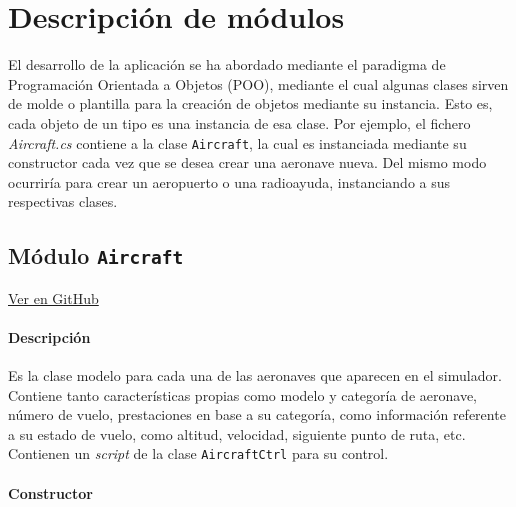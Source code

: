 \section{Descripción de módulos}
\label{sec:DescripciModulos}

El desarrollo de la aplicación se ha abordado mediante el paradigma de Programación Orientada a Objetos (POO), mediante el cual algunas clases sirven de molde o plantilla para la creación de objetos mediante su instancia. Esto es, cada objeto de un tipo es una instancia de esa clase. Por ejemplo, el fichero \textit{Aircraft.cs} contiene a la clase \texttt{Aircraft}, la cual es instanciada mediante su constructor cada vez que se desea crear una aeronave nueva. Del mismo modo ocurriría para crear un aeropuerto o una radioayuda, instanciando a sus respectivas clases. 


\subsection{Módulo \texttt{Aircraft}}
\label{subsec:ClaseAircraft}

\vspace{-0.85cm}
\begin{flushright}
\href{https://github.com/macgyver912/atc-simulator/blob/jaime/Assets/Scripts/aircrafts/Aircraft.cs}{Ver en GitHub \faGithub}
\end{flushright}

\paragraph{Descripción} \phantom{\newline}

Es la clase modelo para cada una de las aeronaves que aparecen en el simulador. Contiene tanto características propias como modelo y categoría de aeronave, número de vuelo, prestaciones en base a su categoría, como información referente a su estado de vuelo, como altitud, velocidad, siguiente punto de ruta, etc. Contienen un \textit{script} de la clase \texttt{AircraftCtrl} para su control.

\paragraph{Constructor} \phantom{\newline}

